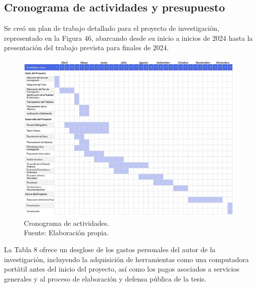 \begin{landscape}
	\section{Cronograma de actividades y presupuesto}
	Se creó un plan de trabajo detallado para el proyecto de investigación, representado en la Figura 46, abarcando desde su inicio a inicios de 2024 hasta la presentación del trabajo prevista para finales de 2024.

	\begin{figure}[!ht]
		\begin{center}
			\includegraphics[width=1.35\textwidth]{3/figures/gantt.jpg}
			\caption[Cronograma de actividades]{Cronograma de actividades.\\
				Fuente: Elaboración propia.}
			\label{3:fig1}
		\end{center}
	\end{figure}
	
\end{landscape}

La Tabla 8 ofrece un desglose de los gastos personales del autor de la investigación, incluyendo la adquisición de herramientas como una computadora portátil antes del inicio del proyecto, así como los pagos asociados a servicios generales y al proceso de elaboración y defensa pública de la tesis.

